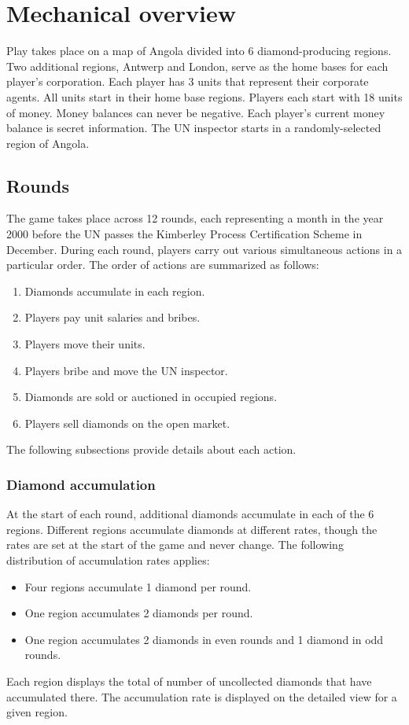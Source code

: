 \documentclass[12pt]{article}
\begin{document}
\section{Mechanical overview}

Play takes place on a map of Angola divided into 6 diamond-producing regions.  Two additional regions, Antwerp and London, serve as the home bases for each player's corporation.  Each player has 3 units that represent their corporate agents.  All units start in their home base regions.  Players each start with 18 units of money.  Money balances can never be negative.  Each player's current money balance is secret information.  The UN inspector starts in a randomly-selected region of Angola.


\subsection{Rounds}

The game takes place across 12 rounds, each representing a month in the year 2000 before the UN passes the Kimberley Process Certification Scheme in December.  During each round, players carry out various simultaneous actions in a particular order.  The order of actions are summarized as follows:
\begin{enumerate}

\item Diamonds accumulate in each region.
\item Players pay unit salaries and bribes.
\item Players move their units.
\item Players bribe and move the UN inspector.
\item Diamonds are sold or auctioned in occupied regions.
\item Players sell diamonds on the open market. 
\end{enumerate}
The following subsections provide details about each action.  


\subsubsection{Diamond accumulation}

At the start of each round, additional diamonds accumulate in each of the 6 regions.  Different regions accumulate diamonds at different rates, though the rates are set at the start of the game and never change.  The following distribution of accumulation rates applies:
\begin{itemize}
\item Four regions accumulate 1 diamond per round.
\item One region accumulates 2 diamonds per round.
\item One region accumulates 2 diamonds in even rounds and 1 diamond in odd rounds.
\end{itemize}
Each region displays the total of number of uncollected diamonds that have accumulated there.  The accumulation rate is displayed on the detailed view for a given region.
\end{document}
